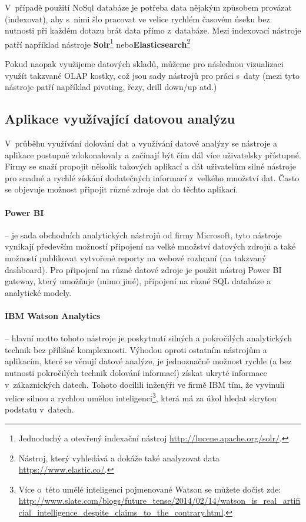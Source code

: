 \par V~případě použití NoSql databáze je potřeba data nějakým způsobem provázat (indexovat), aby s~nimi šlo pracovat ve velice rychlém časovém úseku bez nutnosti při každém dotazu brát data přímo z~databáze. Mezi indexovací nástroje patří například nástroje \textbf{Solr}\footnote{Jednoduchý a otevřený indexační nástroj \url{http://lucene.apache.org/solr/}.} nebo\textbf{Elasticsearch}\footnote{Nástroj, který vyhledává a dokáže také analyzovat data \url{https://www.elastic.co/}.}

\par Pokud naopak využijeme datových skladů, můžeme pro následnou vizualizaci využít takzvané OLAP kostky, což jsou sady nástrojů pro práci s~daty (mezi tyto nástroje patří například pivoting, řezy, drill down/up atd.)

\subsection{Aplikace využívající datovou analýzu}
\par V~průběhu využívání dolování dat a využívání datové analýzy se nástroje a aplikace postupně zdokonalovaly a začínají být čím dál více uživatelsky přístupné. Firmy se snaží propojit několik takových aplikací a dát uživatelům silné nástroje pro snadné a rychlé získání dodatečných informací z~velkého množství dat. Často se objevuje možnost připojit různé zdroje dat do těchto aplikací.

\paragraph{Power BI} -- je sada obchodních analytických nástrojů od firmy Microsoft, tyto nástroje vynikají především možností připojení na velké množství datových zdrojů a také možností publikovat vytvořené reporty na webové rozhraní (na takzvaný dashboard). Pro připojení na různé datové zdroje je použit nástroj Power BI gateway, který umožňuje (mimo jiné), připojení na různé SQL databáze a analytické modely. \cite{powerbi}

\paragraph{IBM Watson Analytics} -- hlavní motto tohoto nástroje je poskytnutí silných a pokročilých analytických technik bez přílišné komplexnosti. Výhodou oproti ostatním nástrojům a aplikacím, které se věnují datové analýze, je jednoznačně možnost rychle (a bez nutnosti pokročilých technik dolování informací) získat ukryté informace v~zákaznických datech. Tohoto docílili inženýři ve firmě IBM tím, že vyvinuli velice silnou a rychlou umělou inteligenci\footnote{Více o~této umělé inteligenci pojmenované Watson se můžete dočíst zde: \url{http://www.slate.com/blogs/future_tense/2014/02/14/watson_is_real_artificial_intelligence_despite_claims_to_the_contrary.html}.}, která má za úkol hledat skrytou podstatu v~datech. \cite{watson}

